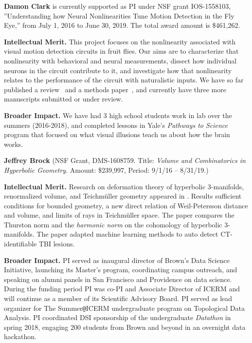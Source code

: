 \vskip10pt \textbf{Damon Clark} is currently supported as PI under NSF
grant IOS-1558103, ''Understanding how Neural Nonlinearities Tune
Motion Detection in the Fly Eye,'' from July 1, 2016 to June 30, 2019.
The total award amount is \$461,262.

{\bf Intellectual Merit.} This project focuses on the nonlinearity
associated with visual motion detection circuits in fruit flies. Our
aims are to characterize that nonlinearity with behavioral and neural
measurements, dissect how individual neurons in the circuit contribute
to it, and investigate how that nonlinearity relates to the
performance of the circuit with naturalistic inputs. We have so far
published a review~\citep{clark:16} and a methods
paper~\citep{mano:17}, and currently have three more manuscripts
submitted or under review.

{\bf Broader Impact.} We have had 3 high school students work in lab
over the summers (2016-2018), and completed lessons in Yale's
\textit{Pathways to Science} program that focused on what visual
illusions teach us about how the brain works.

\vskip10pt \textbf{Jeffrey Brock} (NSF Grant, DMS-1608759. Title: {\em Volume and Combinatorics in Hyperbolic Geometry}. Amount: \$239,997, Period: 9/1/16 --
8/31/19.) 

\textbf{Intellectual Merit.} 
Research on deformation theory of hyperbolic 3-manifolds, renormalized volume, and Teichm\"uller geometry appeared in \citep{BMNS:bounded:models,Brock:Bromberg:vol,Brock:Bromberg:cone:inflex,BLMR:wp:limit,BLMR:teichmuller}. Results sufficient conditions for bounded geometry, a new direct relation of Weil-Petersson distance and volume, and limits of rays in Teichm\"uller space.
The paper \citep{Brock:Dunfield:norms} compares the Thurston norm and the {\em harmonic norm} on the cohomology of   hyperbolic 3-manifolds. The paper \citep{Keshavamurthy:TBI} adapted machine learning methods to auto detect CT-identifiable TBI lesions.

\textbf{Broader Impact.} PI served as inaugural director of Brown's Data Science Initiative, launching its Master's program, coordinating campus outreach, and speaking on alumni panels in San Francisco and Providence on data science. During the funding period PI was co-PI and Associate Director of ICERM and will continue as a member of its Scientific Advisory Board. PI served as lead organizer for The Summer\verb+@+ICERM undergraduate program on Topological Data Analysis.
PI coordinated DSI sponsorship of the undergraduate \textit{Datathon} in spring 2018, engaging 200 students from Brown and beyond in an overnight data hackathon. 
